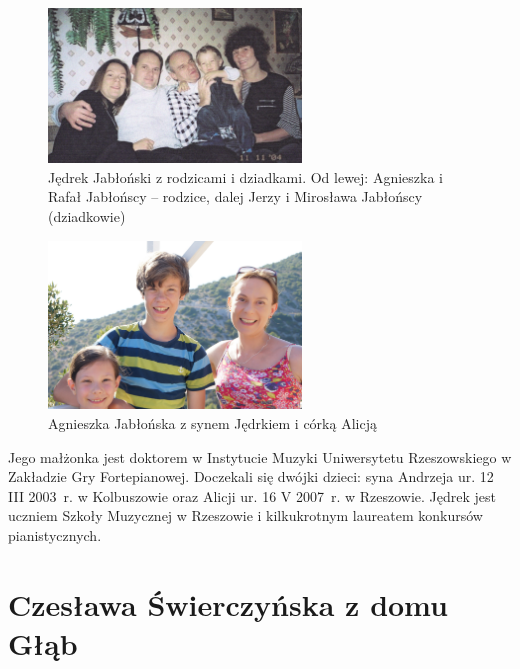 \begin{figure}
\begin{center}
\includegraphics[width=0.6\textwidth]{zdjecia/jedrek_jakblonski_i_rodzina.jpg}
\caption[Jędrek Jabłoński z rodzicami i dziadkami]{Jędrek Jabłoński z rodzicami i dziadkami. Od lewej: Agnieszka i Rafał Jabłońscy -- rodzice, dalej Jerzy i Mirosława Jabłońscy (dziadkowie)}
\label{rys:jedrek_jakblonski_i_rodzina}
\end{center}
\end{figure}


\begin{figure}
	\begin{center}
		\includegraphics[width=0.6\textwidth]{zdjecia/agnieszka_jedrek_alicja_jablonscy.jpg}
		\caption{Agnieszka Jabłońska z synem Jędrkiem i córką Alicją}
		\label{rys:agnieszka_jedrek_alicja_jablonscy}
	\end{center}
\end{figure}




Jego małżonka jest doktorem w Instytucie Muzyki Uniwersytetu Rzeszowskiego w Zakładzie Gry Fortepianowej.  Doczekali się dwójki dzieci: syna Andrzeja ur. 12 III 2003~r. w Kolbuszowie oraz Alicji ur. 16 V 2007~r. w Rzeszowie. Jędrek jest uczniem Szkoły Muzycznej w Rzeszowie i kilkukrotnym laureatem konkursów pianistycznych.





\section{Czesława Świerczyńska z domu Głąb}

